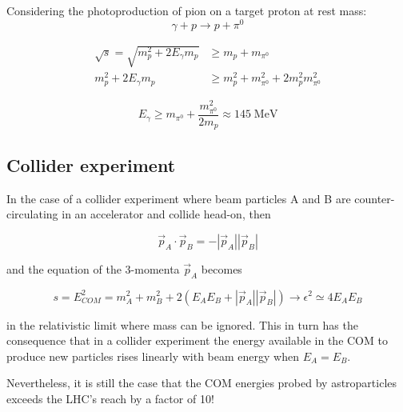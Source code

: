 \documentclass[
  letterpaper,
  DIV=11,
  numbers=noendperiod]{scrreprt}
\begin{document}
\begin{tcolorbox}[enhanced jigsaw, colframe=quarto-callout-tip-color-frame, opacitybacktitle=0.6, left=2mm, leftrule=.75mm, opacityback=0, colbacktitle=quarto-callout-tip-color!10!white, breakable, bottomrule=.15mm, toprule=.15mm, colback=white, coltitle=black, bottomtitle=1mm, toptitle=1mm, titlerule=0mm, title=\textcolor{quarto-callout-tip-color}{\faLightbulb}\hspace{0.5em}{Example 1: Pion production}, arc=.35mm, rightrule=.15mm]

Considering the photoproduction of pion on a target proton at rest mass:
\[\gamma + p \rightarrow p + \pi^0\]

\[\begin{alignedat}{2}
 \sqrt{s} = \sqrt{m_p^2 + 2E_\gamma m_p} &\geq m_p + m_{\pi^0}\\
m_p^2 + 2 E_\gamma m_p &\geq m_p^2 + m^2_{\pi^0} + 2 m_p^2 m^2_{\pi^0}
\end{alignedat}\]

\[E_\gamma \geq m_{\pi^0} + \frac{m^2_{\pi^0}}{2 m_p} \approx 145 \mathrm{ \; MeV}\]

\end{tcolorbox}

\subsection*{Collider experiment}\label{collider-experiment}

In the case of a collider experiment where beam particles A and B are
counter-circulating in an accelerator and collide head-on, then

\[{\vec p}_{A}\cdot{\vec p}_{B} = -|{\vec p}_{A}||{\vec p}_{B}|\]

and the equation of the 3-momenta \({\vec p}_A\) becomes

\[
s = E_{COM}^2 = m_A^2 + m_B^2 + 2(E_AE_B + |{\vec p}_{A}||{\vec p}_{B}|) \rightarrow \epsilon^2 \simeq 4E_AE_B
\]

in the relativistic limit where mass can be ignored. This in turn has
the consequence that in a collider experiment the energy available in
the COM to produce new particles rises linearly with beam energy when
\(E_A = E_B\).

Nevertheless, it is still the case that the COM energies probed by
astroparticles exceeds the LHC's reach by a factor of 10!
\end{document}
